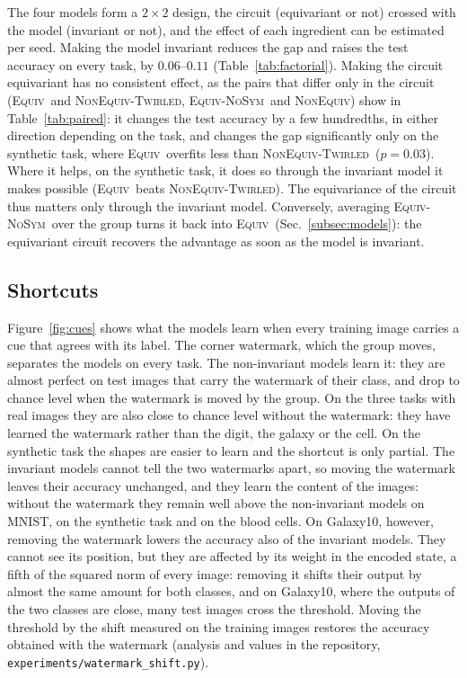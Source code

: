 \documentclass[aps,pra,reprint,superscriptaddress,longbibliography]{revtex4-2}
\newcommand{\Equiv}{\textsc{Equiv}}
\newcommand{\NonEquiv}{\textsc{NonEquiv}}
\newcommand{\Twirled}{\textsc{NonEquiv-Twirled}}
\newcommand{\NoSym}{\textsc{Equiv-NoSym}}
\begin{document}
The four models form a $2\times2$ design, the circuit (equivariant or not) crossed with the model (invariant or not), and the effect of each ingredient can be estimated per seed. Making the model invariant reduces the gap and raises the test accuracy on every task, by $0.06$--$0.11$ (Table~\ref{tab:factorial}). Making the circuit equivariant has no consistent effect, as the pairs that differ only in the circuit (\Equiv\ and \Twirled, \NoSym\ and \NonEquiv) show in Table~\ref{tab:paired}: it changes the test accuracy by a few hundredths, in either direction depending on the task, and changes the gap significantly only on the synthetic task, where \Equiv\ overfits less than \Twirled\ ($p=0.03$). Where it helps, on the synthetic task, it does so through the invariant model it makes possible (\Equiv\ beats \Twirled). The equivariance of the circuit thus matters only through the invariant model. Conversely, averaging \NoSym\ over the group turns it back into \Equiv\ (Sec.~\ref{subsec:models}): the equivariant circuit recovers the advantage as soon as the model is invariant.

\subsection{Shortcuts}\label{subsec:results_cues}

Figure~\ref{fig:cues} shows what the models learn when every training image carries a cue that agrees with its label. The corner watermark, which the group moves, separates the models on every task. The non-invariant models learn it: they are almost perfect on test images that carry the watermark of their class, and drop to chance level when the watermark is moved by the group. On the three tasks with real images they are also close to chance level without the watermark: they have learned the watermark rather than the digit, the galaxy or the cell. On the synthetic task the shapes are easier to learn and the shortcut is only partial. The invariant models cannot tell the two watermarks apart, so moving the watermark leaves their accuracy unchanged, and they learn the content of the images: without the watermark they remain well above the non-invariant models on MNIST, on the synthetic task and on the blood cells. On Galaxy10, however, removing the watermark lowers the accuracy also of the invariant models. They cannot see its position, but they are affected by its weight in the encoded state, a fifth of the squared norm of every image: removing it shifts their output by almost the same amount for both classes, and on Galaxy10, where the outputs of the two classes are close, many test images cross the threshold. Moving the threshold by the shift measured on the training images restores the accuracy obtained with the watermark (analysis and values in the repository, \texttt{experiments/watermark\_shift.py}).
\end{document}
